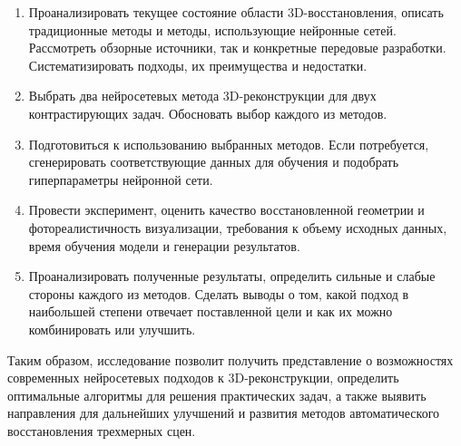\begin{enumerate}
	\item Проанализировать текущее состояние области 3D-восстановления, описать
	традиционные методы и методы, использующие нейронные сетей.  Рассмотреть
	обзорные источники, так и конкретные передовые разработки. Систематизировать
	подходы, их преимущества и недостатки.
	\item Выбрать два нейросетевых метода 3D-реконструкции для двух
	контрастирующих задач. Обосновать выбор каждого из методов.
	\item Подготовиться к использованию выбранных методов. Если потребуется,
	сгенерировать соответствующие данных для обучения и подобрать гиперпараметры
	нейронной сети.
	\item Провести эксперимент, оценить качество восстановленной геометрии и
	фотореалистичность визуализации, требования к объему исходных данных, время
	обучения модели и генерации результатов.
	\item Проанализировать полученные
	результаты, определить сильные и слабые стороны каждого из методов. Сделать
	выводы о том, какой подход в наибольшей степени отвечает поставленной цели и
	как их можно комбинировать или улучшить.
\end{enumerate}

Таким образом, исследование позволит получить представление о
возможностях современных нейросетевых подходов к 3D-реконструкции, определить
оптимальные алгоритмы для решения практических задач, а также выявить
направления для дальнейших улучшений и развития методов автоматического
восстановления трехмерных сцен.
